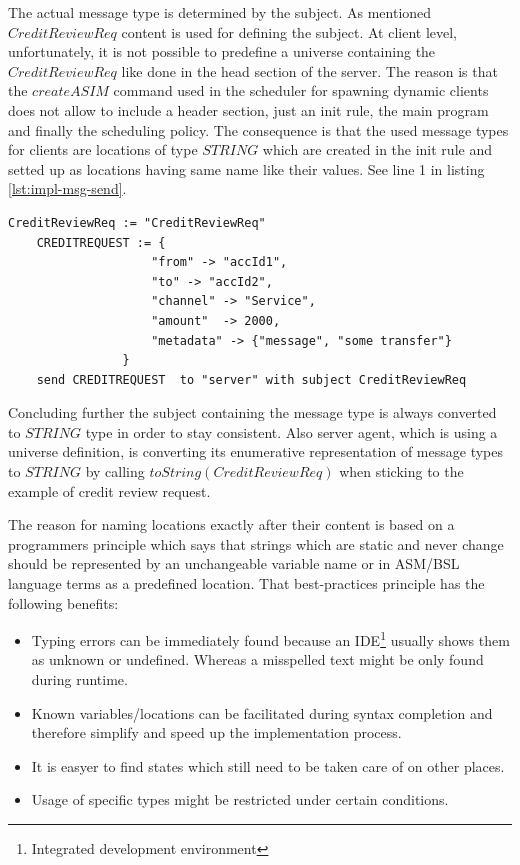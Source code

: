 The actual message type is determined by the subject. As mentioned $CreditReviewReq$ content is used for defining the subject. At client level, unfortunately, it is not possible to predefine a universe containing the $CreditReviewReq$ like done in the head section of the server. The reason is that the $createASIM$ command used in the scheduler for spawning dynamic clients does not allow to include a header section, just an init rule, the main program and finally the scheduling policy. The consequence is that the used message types for clients are locations of type $STRING$ which are created in the init rule and setted up as locations having same name like their values. See line 1 in listing \ref{lst:impl-msg-send}.

\begin{center}
\begin{minipage}{0.8\textwidth}
\small
\begin{lstlisting}[language=bsl_lst,caption={\bf\small send message},label={lst:impl-msg-send} ]
	CreditReviewReq := "CreditReviewReq"
	CREDITREQUEST := {
					"from" -> "accId1",
					"to" -> "accId2",
					"channel" -> "Service",
					"amount"  -> 2000,
					"metadata" -> {"message", "some transfer"}
				}
	send CREDITREQUEST  to "server" with subject CreditReviewReq
\end{lstlisting}
\end{minipage}
\end{center}

Concluding further the subject containing the message type is always converted to $STRING$ type in order to stay consistent. Also server agent, which is using a universe definition, is converting its enumerative representation of message types to $STRING$ by calling $toString(CreditReviewReq)$ when sticking to the example of credit review request.

The reason for naming locations exactly after their content is based on a programmers principle which says that strings which are static and never change should be represented by an unchangeable variable name or in ASM/BSL language terms as a predefined location. That best-practices principle has the following benefits:

\begin{itemize}
	\item Typing errors can be immediately found because an IDE\footnote{Integrated development environment} usually shows them as unknown or undefined. Whereas a misspelled text might be only found during runtime.
	\item Known variables/locations can be facilitated during syntax completion and therefore simplify and speed up the implementation process.
	\item It is easyer to find states which still need to be taken care of on other places.
	\item Usage of specific types might be restricted under certain conditions.
\end{itemize}


